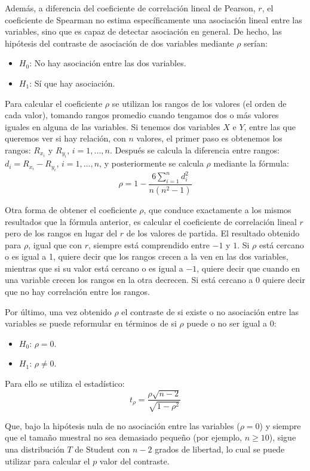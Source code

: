 Además, a diferencia del coeficiente de correlación lineal de Pearson, $r$, el coeficiente de Spearman no estima específicamente una
asociación lineal entre las variables, sino que es capaz de detectar asociación en general. De hecho, las hipótesis del contraste de
asociación de dos variables mediante $\rho$ serían:
\begin{itemize}
\item $H_0$: No hay asociación entre las dos variables.
\item $H_1$: Sí que hay asociación.
\end{itemize}

Para calcular el coeficiente $\rho$ se utilizan los rangos de los valores (el orden de cada valor), tomando rangos promedio cuando tengamos
dos o más valores iguales en alguna de las variables. Si tenemos dos variables $X$ e $Y$, entre las que queremos ver si hay relación, con
$n$ valores, el primer paso es obtenemos los rangos: $R_{x_i}$ y $R_{y_i}$, $i=1,...,n$. Después se calcula la diferencia entre rangos:
$d_i=R_{x_i}-R_{y_i}$, $i=1,...,n$, y posteriormente se calcula $\rho$ mediante la fórmula:
\[
\rho  = 1 - \frac{{6\sum\limits_{i = 1}^n {d_i ^2 } }}{{n\left( {n^2  - 1} \right)}}
\]

Otra forma de obtener el coeficiente $\rho$, que conduce exactamente a los mismos resultados que la fórmula anterior, es calcular el
coeficiente de correlación lineal $r$ pero de los rangos en lugar del $r$ de los valores de partida. El resultado obtenido para $\rho$,
igual que con $r$, siempre está comprendido entre $-1$ y $1$. Si $\rho$ está cercano o es igual a 1, quiere decir que los rangos crecen a la
ven en las dos variables, mientras que si su valor está cercano o es igual a $-1$, quiere decir que cuando en una variable crecen los rangos
en la otra decrecen. Si está cercano a 0 quiere decir que no hay correlación entre los rangos.

Por último, una vez obtenido $\rho$ el contraste de si existe o no asociación entre las variables se puede reformular en términos de si
$\rho$ puede o no ser igual a 0:
\begin{itemize}
\item $H_0$: $\rho=0$.
\item  $H_1$: $\rho\neq0$.
\end{itemize}

Para ello se utiliza el estadístico:
\[
t_\rho   = \frac{{\rho \sqrt {n - 2} }}{{\sqrt {1 - \rho ^2 } }}
\]

Que, bajo la hipótesis nula de no asociación entre las variables ($\rho=0$) y siempre que el tamaño muestral no sea demasiado pequeño (por
ejemplo, $n\geq10$), sigue una distribución $T$ de Student con $n-2$ grados de libertad, lo cual se puede utilizar para calcular el $p$
valor del contraste.

